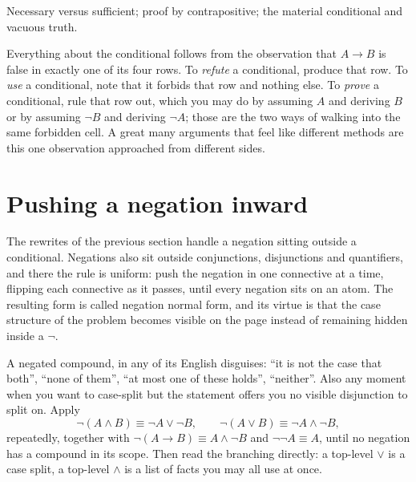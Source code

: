 \begin{seealsob}Necessary versus sufficient; proof by contrapositive; the material conditional and vacuous truth.\end{seealsob}

\begin{keynote}
Everything about the conditional follows from the observation that $A\to B$ is false in exactly one of its four rows. To \emph{refute} a conditional, produce that row. To \emph{use} a conditional, note that it forbids that row and nothing else. To \emph{prove} a conditional, rule that row out, which you may do by assuming $A$ and deriving $B$ or by assuming $\lnot B$ and deriving $\lnot A$; those are the two ways of walking into the same forbidden cell. A great many arguments that feel like different methods are this one observation approached from different sides.
\end{keynote}

\section{Pushing a negation inward}

The rewrites of the previous section handle a negation sitting outside a conditional. Negations also sit outside conjunctions, disjunctions and quantifiers, and there the rule is uniform: push the negation in one connective at a time, flipping each connective as it passes, until every negation sits on an atom. The resulting form is called negation normal form, and its virtue is that the case structure of the problem becomes visible on the page instead of remaining hidden inside a $\lnot$.

\cue A negated compound, in any of its English disguises: ``it is not the case that both'', ``none of them'', ``at most one of these holds'', ``neither''. Also any moment when you want to case-split but the statement offers you no visible disjunction to split on.
\method Apply
\[\lnot(A\wedge B)\equiv\lnot A\vee\lnot B,\qquad \lnot(A\vee B)\equiv\lnot A\wedge\lnot B,\]
repeatedly, together with $\lnot(A\to B)\equiv A\wedge\lnot B$ and $\lnot\lnot A\equiv A$, until no negation has a compound in its scope. Then read the branching directly: a top-level $\vee$ is a case split, a top-level $\wedge$ is a list of facts you may all use at once.

